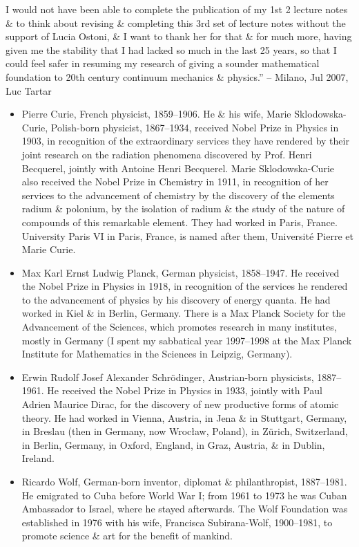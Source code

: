 \documentclass{article}
\begin{document}
\begin{enumerate}
	I would not have been able to complete the publication of my 1st 2 lecture notes \& to think about revising \& completing this 3rd set of lecture notes without the support of {\sc Lucia Ostoni}, \& I want to thank her for that \& for much more, having given me the stability that I had lacked so much in the last 25 years, so that I could feel safer in resuming my research of giving a sounder mathematical foundation to 20th century continuum mechanics \& physics.'' -- Milano, Jul 2007, {\sc Luc Tartar}
	\begin{itemize}
		\item {\sc Pierre Curie}, French physicist, 1859--1906. He \& his wife, {\sc Marie Sklodowska-Curie}, Polish-born physicist, 1867--1934, received Nobel Prize in Physics in 1903, in recognition of the extraordinary services they have rendered by their joint research on the radiation phenomena discovered by Prof. {\sc Henri Becquerel}, jointly with {\sc Antoine Henri Becquerel}. {\sc Marie Sklodowska-Curie} also received the Nobel Prize in Chemistry in 1911, in recognition of her services to the advancement of chemistry by the discovery of the elements radium \& polonium, by the isolation of radium \& the study of the nature of compounds of this remarkable element. They had worked in Paris, France. University Paris VI in Paris, France, is named after them, Université Pierre et Marie Curie.
		\item {\sc Max Karl Ernst Ludwig Planck}, German physicist, 1858--1947. He received the Nobel Prize in Physics in 1918, in recognition of the services he rendered to the advancement of physics by his discovery of energy quanta. He had worked in Kiel \& in Berlin, Germany. There is a Max Planck Society for the Advancement of the Sciences, which promotes research in many institutes, mostly in Germany (I spent my sabbatical year 1997--1998 at the Max Planck Institute for Mathematics in the Sciences in Leipzig, Germany).
		\item {\sc Erwin Rudolf Josef Alexander Schr\"odinger}, Austrian-born physicists, 1887--1961. He received the Nobel Prize in Physics in 1933, jointly with {\sc Paul Adrien Maurice Dirac}, for the discovery of new productive forms of atomic theory. He had worked in Vienna, Austria, in Jena \& in Stuttgart, Germany, in Breslau (then in Germany, now Wroc\l aw, Poland), in Zürich, Switzerland, in Berlin, Germany, in Oxford, England, in Graz, Austria, \& in Dublin, Ireland.
		\item {\sc Ricardo Wolf}, German-born inventor, diplomat \& philanthropist, 1887--1981. He emigrated to Cuba before World War I; from 1961 to 1973 he was Cuban Ambassador to Israel, where he stayed afterwards. The Wolf Foundation was established in 1976 with his wife,  {\sc Francisca Subirana-Wolf}, 1900--1981, to promote science \& art for the benefit of mankind.

\end{itemize}
\end{enumerate}
\end{document}
